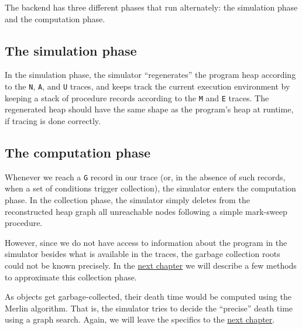 The backend has three different phases that run alternately: the simulation phase and the computation phase.

\subsection{The simulation phase}
In the simulation phase, the simulator ``regenerates'' the program heap according to the \lstinline{N}, \lstinline{A}, and \lstinline{U} traces, and keeps
track the current execution environment by keeping a stack of procedure records according to the \lstinline{M} and \lstinline{E} traces. The regenerated
heap should have the same shape as the program's heap at runtime, if tracing is done correctly.

\subsection{The computation phase}
Whenever we reach a \lstinline{G} record in our trace (or, in the absence of such records, when a set of conditions trigger collection), the simulator enters
the computation phase. In the collection phase, the simulator simply deletes from the reconstructed heap graph all unreachable nodes following a simple
mark-sweep procedure.

However, since we do not have access to information about the program in the simulator besides what is available in the traces, the garbage collection roots
could not be known precisely. In the \hyperref[chap:algoimp]{next chapter} we will describe a few methods to approximate this collection phase.

As objects get garbage-collected, their death time would be computed using the Merlin algorithm. That is, the simulator tries to decide the ``precise'' death
time using a graph search. Again, we will leave the specifics to the \hyperref[chap:algoimp]{next chapter}.
